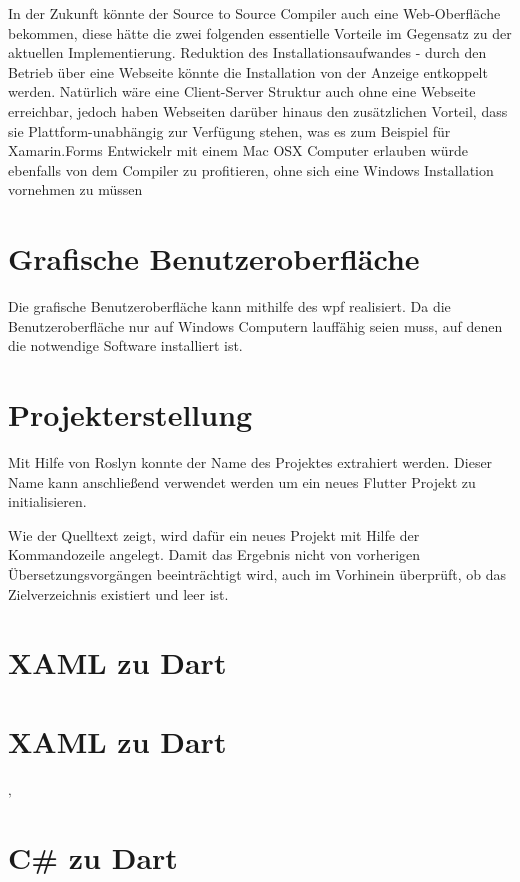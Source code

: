 In der Zukunft könnte der Source to Source Compiler auch eine Web-Oberfläche bekommen,  diese hätte die zwei folgenden essentielle Vorteile im Gegensatz zu der aktuellen Implementierung.  Reduktion des Installationsaufwandes - durch den Betrieb über eine Webseite könnte die Installation von der Anzeige entkoppelt werden.  Natürlich wäre eine Client-Server Struktur auch ohne eine Webseite erreichbar,  jedoch haben Webseiten darüber hinaus den zusätzlichen Vorteil,  dass sie Plattform-unabhängig zur Verfügung stehen,  was es zum Beispiel für Xamarin.Forms Entwickelr mit einem Mac OSX Computer erlauben würde ebenfalls von dem Compiler zu profitieren, ohne sich eine Windows Installation vornehmen zu müssen

\section{Grafische Benutzeroberfläche}
Die grafische Benutzeroberfläche kann mithilfe des \ac{wpf} realisiert.  Da die Benutzeroberfläche nur auf Windows Computern lauffähig seien muss,  auf denen die notwendige Software installiert ist. 

\section{Projekterstellung}
Mit Hilfe von Roslyn konnte der Name des Projektes extrahiert werden.  Dieser Name kann anschließend verwendet werden um ein neues Flutter Projekt zu initialisieren.  

Wie der Quelltext zeigt,  wird dafür ein neues Projekt mit Hilfe der Kommandozeile angelegt.  Damit das Ergebnis nicht von vorherigen Übersetzungsvorgängen beeinträchtigt wird,  auch im Vorhinein überprüft,  ob das Zielverzeichnis existiert und leer ist. 


\section{XAML zu Dart}

\section{XAML zu Dart}
‚
\section{C\# zu Dart}

